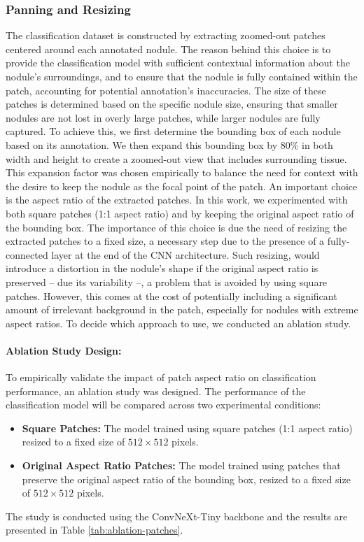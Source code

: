 \subsubsection{Panning and Resizing}
The classification dataset is constructed by extracting zoomed-out patches centered around each annotated nodule. The reason behind this choice is to provide the classification model with sufficient contextual information about the nodule's surroundings, and to ensure that the nodule is fully contained within the patch, accounting for potential annotation's inaccuracies. The size of these patches is determined based on the specific nodule size, ensuring that smaller nodules are not lost in overly large patches, while larger nodules are fully captured.
To achieve this, we first determine the bounding box of each nodule based on its annotation. We then expand this bounding box by 80\% in both width and height to create a zoomed-out view that includes surrounding tissue.
This expansion factor was chosen empirically to balance the need for context with the desire to keep the nodule as the focal point of the patch.
An important choice is the aspect ratio of the extracted patches. In this work, we experimented with both square patches (1:1 aspect ratio) and by keeping the original aspect ratio of the bounding box. The importance of this choice is due the need of resizing the extracted patches to a fixed size, a necessary step due to the presence of a fully-connected layer at the end of the CNN architecture. Such resizing, would introduce a distortion in the nodule's shape if the original aspect ratio is preserved -- due its variability --, a problem that is avoided by using square patches. However, this comes at the cost of potentially including a significant amount of irrelevant background in the patch, especially for nodules with extreme aspect ratios. 
To decide which approach to use, we conducted an ablation study.

\paragraph{Ablation Study Design:}
To empirically validate the impact of patch aspect ratio on classification performance, an ablation study was designed. The performance of the classification model will be compared across two experimental conditions:
\begin{itemize}
    \item \textbf{Square Patches:} The model trained using square patches (1:1 aspect ratio) resized to a fixed size of $512\times512$ pixels.
    \item \textbf{Original Aspect Ratio Patches:} The model trained using patches that preserve the original aspect ratio of the bounding box, resized to a fixed size of $512\times512$ pixels. 
\end{itemize}
The study is conducted using the ConvNeXt-Tiny backbone \cite{liu2022convnext} and the results are presented in Table \ref{tab:ablation-patches}.


